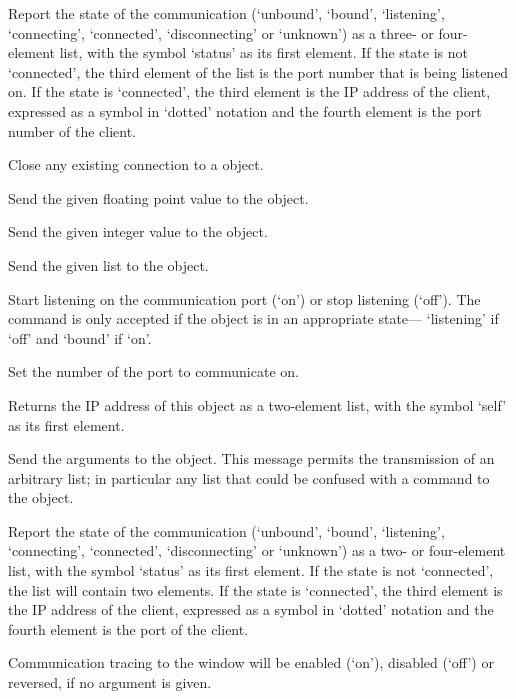   Report the state of the communication (`unbound', `bound', `listening', `connecting', `connected',
  `disconnecting' or `unknown') as a three- or four-element list, with the symbol `status' as its
  first element.
  If the state is not `connected', the third element of the list is the port number that is being
  listened on.
  If the state is `connected', the third element is the IP address of the client, expressed as a
  symbol in `dotted' notation and the fourth element is the port number of the client.

  Close any existing connection to a  object.

  Send the given floating point value to the  object.

  Send the given integer value to the  object.

  Send the given list to the  object.

  Start listening on the communication port (`on') or stop listening (`off').
  The command is only accepted if the  object is in an appropriate state---
  `listening' if `off' and `bound' if `on'.

  Set the number of the port to communicate on.

  Returns the IP address of this object as a two-element list, with the symbol `self' as its first
  element.
  
  Send the arguments to the  object.
  This message permits the transmission of an arbitrary list; in particular any list that could be
  confused with a command to the  object.

  Report the state of the communication (`unbound', `bound', `listening', `connecting', `connected',
  `disconnecting' or `unknown') as a two- or four-element list, with the symbol `status' as its
  first element.
  If the state is not `connected', the list will contain two elements.
  If the state is `connected', the third element is the IP address of the client, expressed as a
  symbol in `dotted' notation and the fourth element is the port of the client.

  Communication tracing to the \MaxName{} window will be enabled (`on'), disabled (`off') or
  reversed, if no argument is given.
  

